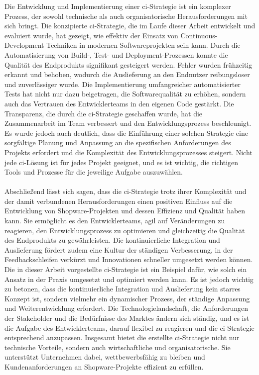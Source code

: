 Die Entwicklung und Implementierung einer \acrshort{ci}-Strategie ist ein komplexer Prozess, der sowohl technische als
auch organisatorische Herausforderungen mit sich bringt.
Die konzipierte \acrshort{ci}-Strategie, die im Laufe dieser Arbeit entwickelt und evaluiert wurde, hat gezeigt, wie
effektiv der Einsatz von Continuous-Development-Techniken in modernen Softwareprojekten sein kann.
Durch die Automatisierung von Build-, Test- und Deployment-Prozessen konnte die Qualität des Endprodukts signifikant
gesteigert werden.
Fehler wurden frühzeitig erkannt und behoben, wodurch die Auslieferung an den Endnutzer reibungsloser und zuverlässiger
wurde.
Die Implementierung umfangreicher automatisierter Tests hat nicht nur dazu beigetragen, die Softwarequalität zu erhöhen,
sondern auch das Vertrauen des Entwicklerteams in den eigenen Code gestärkt.
Die Transparenz, die durch die \acrshort{ci}-Strategie geschaffen wurde, hat die Zusammenarbeit im Team verbessert und
den Entwicklungsprozess beschleunigt.
Es wurde jedoch auch deutlich, dass die Einführung einer solchen Strategie eine sorgfältige Planung und Anpassung an die
spezifischen Anforderungen des Projekts erfordert und die Komplexität des Entwicklungsprozesses steigert.
Nicht jede \acrshort{ci}-Lösung ist für jedes Projekt geeignet, und es ist wichtig, die richtigen Tools und Prozesse
für die jeweilige Aufgabe auszuwählen.
\\\\
Abschließend lässt sich sagen, dass die \acrshort{ci}-Strategie trotz ihrer Komplexität und der damit verbundenen
Herausforderungen einen positiven Einfluss auf die Entwicklung von Shopware-Projekten und dessen Effizienz und Qualität
haben kann.
Sie ermöglicht es den Entwicklerteams, agil auf Veränderungen zu reagieren, den Entwicklungsprozess zu optimieren
und gleichzeitig die Qualität des Endprodukts zu gewährleisten.
Die kontinuierliche Integration und Auslieferung fördert zudem eine Kultur der ständigen Verbesserung, in der
Feedbackschleifen verkürzt und Innovationen schneller umgesetzt werden können.
Die in dieser Arbeit vorgestellte \acrshort{ci}-Strategie ist ein Beispiel dafür, wie solch ein Ansatz in der Praxis
umgesetzt und optimiert werden kann.
Es ist jedoch wichtig zu betonen, dass die kontinuierliche Integration und Auslieferung kein starres Konzept ist,
sondern vielmehr ein dynamischer Prozess, der ständige Anpassung und Weiterentwicklung erfordert.
Die Technologielandschaft, die Anforderungen der Stakeholder und die Bedürfnisse des Marktes ändern sich ständig, und
es ist die Aufgabe des Entwicklerteams, darauf flexibel zu reagieren und die \acrshort{ci}-Strategie entsprechend
anzupassen.
Insgesamt bietet die erstellte \acrshort{ci}-Strategie nicht nur technische Vorteile, sondern auch wirtschaftliche und
organisatorische.
Sie unterstützt Unternehmen dabei, wettbewerbsfähig zu bleiben und Kundenanforderungen an Shopware-Projekte effizient
zu erfüllen.

